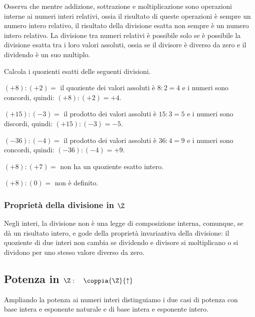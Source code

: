 Osserva che mentre addizione, sottrazione e moltiplicazione sono operazioni 
interne ai numeri interi relativi, ossia il risultato di queste operazioni 
è sempre un numero intero relativo, il risultato della divisione esatta non 
sempre è un numero intero relativo. 
La divisione tra numeri relativi è possibile solo se è possibile la divisione 
esatta tra i loro valori assoluti, ossia se
il divisore è diverso da zero e il dividendo è un suo multiplo.

\begin{esempio}{}{}
Calcola i quozienti esatti delle seguenti divisioni.
\begin{enumeratea}
\item \((+8) : (+2)=\) 
il quoziente dei valori assoluti è \(8 : 2 = 4\) 
e i numeri sono concordi, quindi: \((+8) : (+2) = +4\).
\item \((+15) : (-3) =\) 
il prodotto dei valori assoluti è \(15 : 3 = 5\) 
e i numeri sono discordi, quindi: \((+15) : (-3) = -5\).
\item \((-36) : (-4) =\) 
il prodotto dei valori assoluti è \(36 : 4 = 9\) 
e i numeri sono concordi, quindi: \((-36) : (-4) = +9\).
\item \((+8) : (+7) =\) non ha un quoziente esatto intero.
\item \((+8) : (0) =\) non è definito.
\end{enumeratea}
\end{esempio}

\subsubsection{Proprietà della divisione in \(\Z\)}

Negli interi, la divisione non è una legge di composizione interna, 
comunque, se dà un risultato intero, e gode della proprietà invariantiva 
della divisione: 
il quoziente di due interi non cambia se dividendo e divisore si 
moltiplicano o si dividono per uno stesso valore diverso da zero.



\subsection{Potenza in $\Z: \quad \coppia{\Z}{\uparrow}$}

Ampliando la potenza ai numeri interi distinguiamo i due casi di potenza con 
base intera e esponente naturale e di base intera e esponente intero. 

